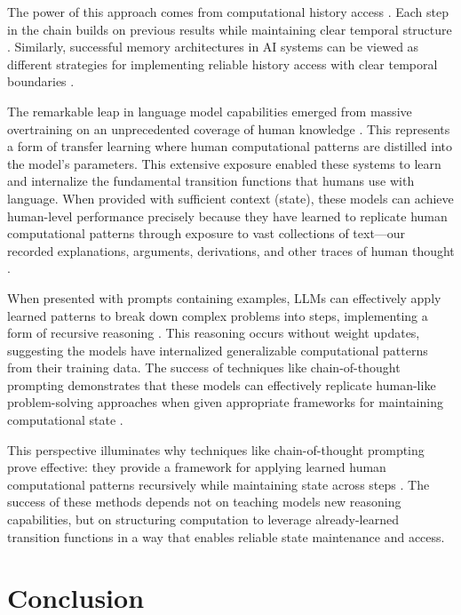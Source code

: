\documentclass[12pt]{article}
\begin{document}
The power of this approach comes from computational history access \cite{fu2024memory}.
Each step in the chain builds on previous results while maintaining clear temporal structure \cite{wei2022chain}.
Similarly, successful memory architectures in AI systems can be viewed as different strategies for implementing reliable history access with clear temporal boundaries \cite{yang2013survey}.

The remarkable leap in language model capabilities emerged from massive overtraining on an unprecedented coverage of human knowledge \cite{schuurmans2024autoregressive}.
This represents a form of transfer learning where human computational patterns are distilled into the model's parameters.
This extensive exposure enabled these systems to learn and internalize the fundamental transition functions that humans use with language.
When provided with sufficient context (state), these models can achieve human-level performance precisely because they have learned to replicate human computational patterns through exposure to vast collections of text---our recorded explanations, arguments, derivations, and other traces of human thought \cite{brown2020language,wei2022chain}.

When presented with prompts containing examples, LLMs can effectively apply learned patterns to break down complex problems into steps, implementing a form of recursive reasoning \cite{wei2022chain}.
This reasoning occurs without weight updates, suggesting the models have internalized generalizable computational patterns from their training data.
The success of techniques like chain-of-thought prompting demonstrates that these models can effectively replicate human-like problem-solving approaches when given appropriate frameworks for maintaining computational state \cite{wei2022emergent}.

This perspective illuminates why techniques like chain-of-thought prompting prove effective: they provide a framework for applying learned human computational patterns recursively while maintaining state across steps \cite{wei2022chain}.
The success of these methods depends not on teaching models new reasoning capabilities, but on structuring computation to leverage already-learned transition functions in a way that enables reliable state maintenance and access.


\section{Conclusion}
\end{document}
